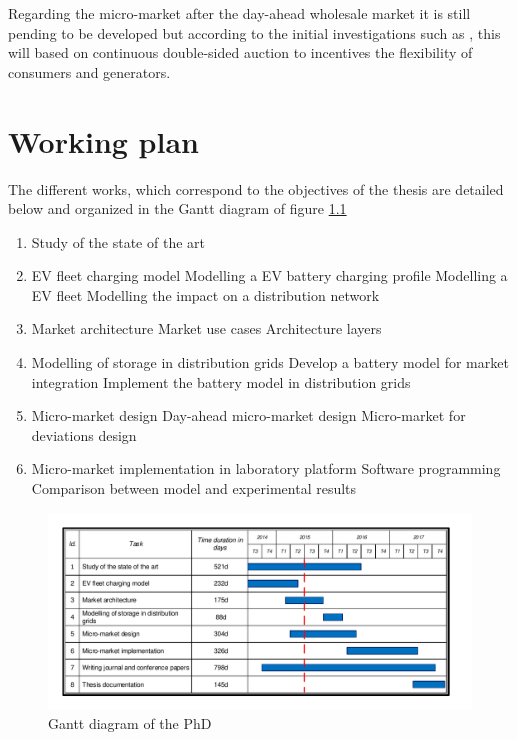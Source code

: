 \documentclass[a4paper,11pt,twoside,openright]{report}
\begin{document}
Regarding the micro-market after the day-ahead wholesale market it is still pending to be developed but according to the initial investigations such as \cite{ampatzis2014}, this will based on continuous double-sided auction to incentives the flexibility of consumers and generators.  

\chapter{Working plan}
The different works, which correspond to the objectives of the thesis are detailed below and organized in the Gantt diagram of figure \ref{fig:Gantt}

\begin{enumerate}
	\item Study of the state of the art
	\item EV fleet charging model
	\subitem Modelling a EV battery charging profile
	\subitem Modelling a EV fleet
	\subitem Modelling the impact on a distribution network
	\item Market architecture
	\subitem Market use cases
	\subitem Architecture layers
	\item Modelling of storage in distribution grids
	\subitem Develop a battery model for market integration
	\subitem Implement the battery model in distribution grids
	\item Micro-market design
	\subitem Day-ahead micro-market design
	\subitem Micro-market for deviations design
	\item Micro-market implementation in laboratory platform
	\subitem Software programming
	\subitem Comparison between model and experimental results
\end{enumerate}

\begin{landscape}
	\begin{figure}[h!]
		\centering
		\includegraphics[scale=1]{Visios/Gantt}
		\caption{Gantt diagram of the PhD}
		\label{fig:Gantt}	
	\end{figure}
\end{landscape}
\end{document}
